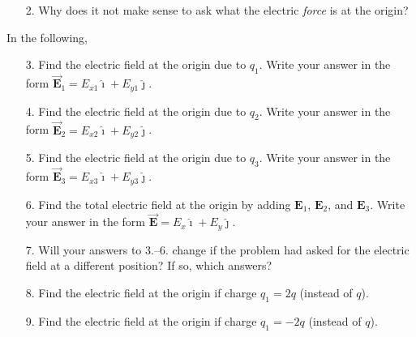 \documentclass{article}
\newcommand{\ihat}[0]{\hat{\boldsymbol{\imath}}}
\newcommand{\jhat}[0]{\hat{\boldsymbol{\jmath}}}
\newcommand{\bfvec}[1]{\vec{\mathbf{#1}}}
\begin{document}


\begin{enumerate}

  \item[2.] Why does it not make sense to ask what the electric \emph{force} is at the origin?

\end{enumerate}

\vskip 24pt

In the following, 

\begin{enumerate}

  \item[3.] Find the electric field at the origin due to $q_1$. Write your answer in the form $\bfvec{E}_1=E_{x1}\ihat + E_{y1}\jhat$.

\end{enumerate}

\vskip 72pt

\begin{enumerate}

  \item[4.] Find the electric field at the origin due to $q_2$. Write your answer in the form $\bfvec{E}_2=E_{x2}\ihat + E_{y2}\jhat$.

\end{enumerate}

\vskip 72pt

\begin{enumerate}

  \item[5.] Find the electric field at the origin due to $q_3$. Write your answer in the form $\bfvec{E}_3=E_{x3}\ihat + E_{y3}\jhat$.

\end{enumerate}

\vskip 72pt

\begin{enumerate}

  \item[6.] Find the total electric field at the origin by adding $\mathbf{E}_1$, $\mathbf{E}_2$, and $\mathbf{E}_3$. Write your answer in the form $\bfvec{E}=E_{x}\ihat + E_{y}\jhat$.

\end{enumerate}

\vskip 72pt

\begin{enumerate}

  \item[7.] Will your answers to 3.--6. change if the problem had asked for the electric field at a different position? If so, which answers?

\end{enumerate}

\vskip 72pt

\begin{enumerate}

  \item[8.] Find the electric field at the origin if charge $q_1=2q$ (instead of $q$).

\end{enumerate}

\vskip 144pt

\begin{enumerate}

  \item[9.] Find the electric field at the origin if charge $q_1=-2q$ (instead of $q$).

\end{enumerate}
\end{document}

